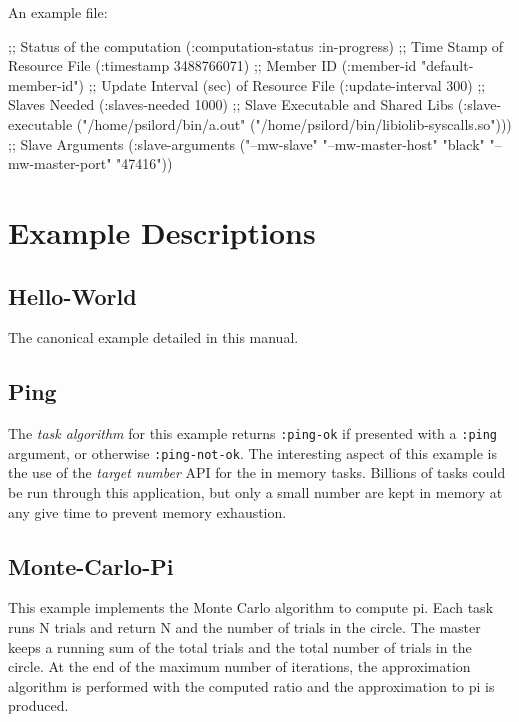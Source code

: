 \documentclass[titlepage,12pt]{book}
\newcommand{\ta}{\textit{task algorithm}\xspace}
\newcommand{\rfile}{\textit{resource file}\xspace}
\newcommand{\keyword}[1]{\texttt{:#1}\xspace}
\begin{document}
An example file:

\begin{lisp}[caption=Contents of a sample \rfile]
;; Status of the computation
(:computation-status :in-progress)
;; Time Stamp of Resource File
(:timestamp 3488766071)
;; Member ID
(:member-id "default-member-id")
;; Update Interval (sec) of Resource File
(:update-interval 300)
;; Slaves Needed
(:slaves-needed 1000)
;; Slave Executable and Shared Libs
(:slave-executable 
   ("/home/psilord/bin/a.out" ("/home/psilord/bin/libiolib-syscalls.so")))
;; Slave Arguments
(:slave-arguments ("--mw-slave" "--mw-master-host" "black" 
                   "--mw-master-port" "47416"))
\end{lisp}


\appendix

\chapter{Example Descriptions}

\section{Hello-World}
The canonical example detailed in this manual.

\section{Ping}
The \ta for this example returns \keyword{ping-ok} if presented with
a \keyword{ping} argument, or otherwise \keyword{ping-not-ok}. The
interesting aspect of this example is the use of the \emph{target
number} API for the in memory tasks. Billions of tasks could be run
through this application, but only a small number are kept in memory
at any give time to prevent memory exhaustion.

\section{Monte-Carlo-Pi}
This example implements the Monte Carlo algorithm to compute pi. Each
task runs N trials and return N and the number of trials in the
circle. The master keeps a running sum of the total trials and the
total number of trials in the circle. At the end of the maximum
number of iterations, the approximation algorithm is performed with
the computed ratio and the approximation to pi is produced.
\end{document}
